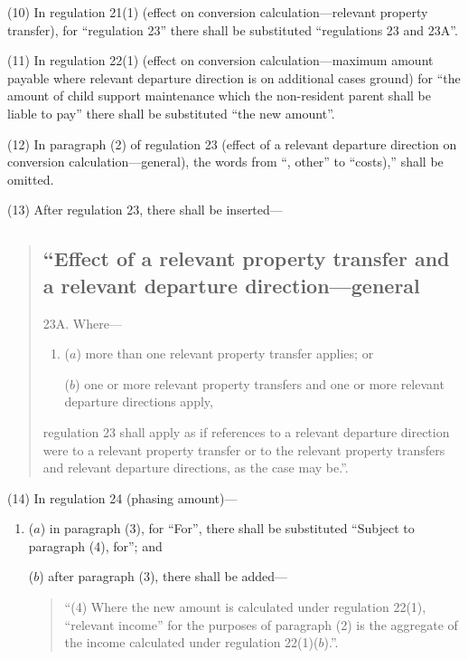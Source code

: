\documentclass[12pt,a4paper]{article}
\begin{document}
(10) In regulation 21(1) (effect on conversion calculation—relevant property transfer), for “regulation 23” there shall be substituted “regulations 23 and 23A”.

(11) In regulation 22(1) (effect on conversion calculation—maximum amount payable where relevant departure direction is on additional cases ground) for “the amount of child support maintenance which the non-resident parent shall be liable to pay” there shall be substituted “the new amount”.

(12) In paragraph (2) of regulation 23 (effect of a relevant departure direction on conversion calculation—general), the words from “, other” to “costs),” shall be omitted.

(13) After regulation 23, there shall be inserted—
\begin{quotation}
\subsection*{“Effect of a relevant property transfer and a relevant departure direction—general}

23A.  Where—
\begin{enumerate}\item[]
($a$) more than one relevant property transfer applies; or

($b$) one or more relevant property transfers and one or more relevant departure directions apply,
\end{enumerate}
regulation 23 shall apply as if references to a relevant departure direction were to a relevant property transfer or to the relevant property transfers and relevant departure directions, as the case may be.”.
\end{quotation}

(14) In regulation 24 (phasing amount)—
\begin{enumerate}\item[]
($a$) in paragraph (3), for “For”, there shall be substituted “Subject to paragraph (4), for”; and

($b$) after paragraph (3), there shall be added—
\begin{quotation}
“(4) Where the new amount is calculated under regulation 22(1), “relevant income” for the purposes of paragraph (2) is the aggregate of the income calculated under regulation 22(1)($b$).”.
\end{quotation}
\end{enumerate}
\end{document}

